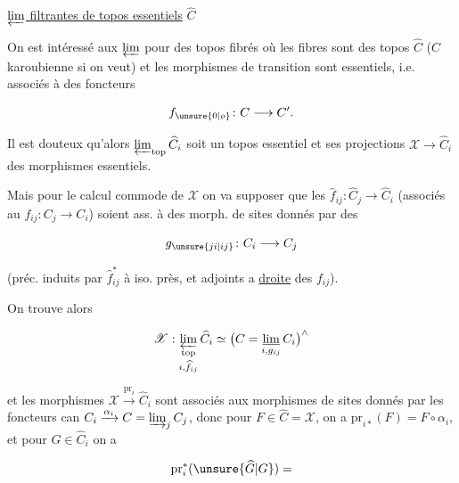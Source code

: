 \uline{$\varprojlim$ filtrantes de topos essentiels} $\widehat C$

On est intéressé aux $\varprojlim$ pour des topos fibrés où les fibres sont des topos $\widehat C$ ($C$ karoubienne  si on veut) et les morphismes de transition  sont essentiels, i.e. associés à des foncteurs

\[
f_{\unsure{0|o}}\colon C\longrightarrow C'.
\]

Il est douteux qu'alors  $\varprojlim_{\mathrm{top}}\widehat C_i$ soit un topos essentiel et ses projections $\mathscr X\longrightarrow\widehat C_i$ des morphismes essentiels.

Mais pour le calcul commode de $\mathscr X$ on va supposer que les $\widehat f_{ij}\colon\widehat C_j\longrightarrow\widehat C_i$  (associés au $f_{ij}\colon C_j\longrightarrow C_i$) soient ass. à des morph. de sites donnés par des 

\[
g_{\unsure{ji|ij}}\colon C_i\longrightarrow C_j
\]

(préc. induits par $\widehat f_{ij}^{*}$ à iso. près, et adjoints a \uline{droite} des $f_{ij}$).

On trouve alors

\[
\mathscr X:\mathop{\varprojlim_{\mathrm{top}}}_{i,\widehat f_{ij}}\widehat C_i
\simeq\bigl(C=\mathop{\underline{\lim}}_{i,g_{ij}}C_i\bigr)^{\wedge}
\]

et les morphismes $\mathscr X\xrightarrow{\mathrm{pr}_i}\widehat C_i$ sont associés aux morphismes de sites donnés par les foncteurs can $C_i\xrightarrow{\alpha_i}C=\mathop{\varinjlim}_j C_j$, donc pour $F\in\widehat C=\mathscr X$, on a $\mathrm{pr}_{i*}(F)=F\circ\alpha_i$, et pour $G\in\widehat C_i$ on a

\[
\mathrm{pr}_i^*(\unsure{\widehat G|G})=
\]

